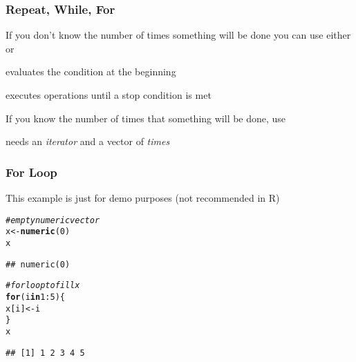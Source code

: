 \documentclass[12pt]{beamer}\usepackage[]{graphicx}\usepackage[]{color}
\makeatletter
\newcommand{\hlnum}[1]{\textcolor[rgb]{0.686,0.059,0.569}{#1}}%
\newcommand{\hlcom}[1]{\textcolor[rgb]{0.678,0.584,0.686}{\textit{#1}}}%
\newcommand{\hlopt}[1]{\textcolor[rgb]{0,0,0}{#1}}%
\newcommand{\hlstd}[1]{\textcolor[rgb]{0.345,0.345,0.345}{#1}}%
\newcommand{\hlkwa}[1]{\textcolor[rgb]{0.161,0.373,0.58}{\textbf{#1}}}%
\newcommand{\hlkwb}[1]{\textcolor[rgb]{0.69,0.353,0.396}{#1}}%
\newcommand{\hlkwd}[1]{\textcolor[rgb]{0.737,0.353,0.396}{\textbf{#1}}}%
\newenvironment{kframe}{%
 \def\at@end@of@kframe{}%
 \ifinner\ifhmode%
  \def\at@end@of@kframe{\end{minipage}}%
  \begin{minipage}{\columnwidth}%
 \fi\fi%
 \def\FrameCommand##1{\hskip\@totalleftmargin \hskip-\fboxsep
 \colorbox{shadecolor}{##1}\hskip-\fboxsep
     \hskip-\linewidth \hskip-\@totalleftmargin \hskip\columnwidth}%
 \MakeFramed {\advance\hsize-\width
   \@totalleftmargin\z@ \linewidth\hsize
   \@setminipage}}%
 {\par\unskip\endMakeFramed%
 \at@end@of@kframe}
\newenvironment{knitrout}{}{} %
\makeatother
\begin{document}

\begin{frame}
\frametitle{Repeat, While, For}

\bi
  \item If you don't know the number of times something will be done you can use either  or 
  \item {} evaluates the condition at the beginning
  \item {} executes operations until a stop condition is met
  \item If you know the number of times that something will be done, use 
  \item {} needs an \textit{iterator} and a vector of \textit{times}
\ei

\end{frame}


\begin{frame}[fragile]
\frametitle{For Loop}

This example is just for demo purposes (not recommended in R)
\begin{knitrout}\footnotesize
{}\color{fgcolor}\begin{kframe}
\begin{alltt}
\hlcom{# empty numeric vector}
\hlstd{x} \hlkwb{<-} \hlkwd{numeric}\hlstd{(}\hlnum{0}\hlstd{)}
\hlstd{x}
\end{alltt}
\begin{verbatim}
## numeric(0)
\end{verbatim}
\begin{alltt}
\hlcom{# for loop to fill x}
\hlkwa{for} \hlstd{(i} \hlkwa{in} \hlnum{1}\hlopt{:}\hlnum{5}\hlstd{) \{}
  \hlstd{x[i]} \hlkwb{<-} \hlstd{i}
\hlstd{\}}
\hlstd{x}
\end{alltt}
\begin{verbatim}
## [1] 1 2 3 4 5
\end{verbatim}
\end{kframe}
\end{knitrout}

\end{frame}

\end{document}
